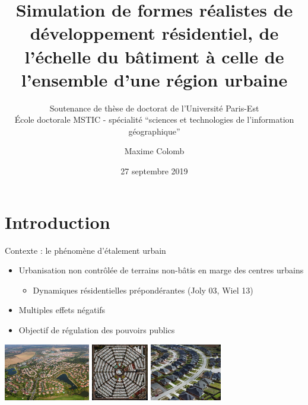 \documentclass[xcolor=table]{beamer}
\title{Simulation de formes réalistes de développement résidentiel, de l'échelle du bâtiment à celle de l'ensemble d'une région urbaine}
\author{Maxime Colomb}
\subtitle{
  \tiny
  Soutenance de thèse de doctorat de l'Université Paris-Est\\
  \'Ecole doctorale MSTIC - spécialité ``sciences et technologies de l'information géographique''
}
\date{27 septembre 2019}
\begin{document}
\maketitle
\section{Introduction}
\begin{frame}{Contexte : le phénomène d'étalement urbain}
	\begin{block}{}
		\begin{itemize}
			\item Urbanisation non contrôlée de terrains non-bâtis en marge des centres urbains
			\begin{itemize}
				\item Dynamiques résidentielles prépondérantes (Joly 03, Wiel 13)
			\end{itemize}
			\item Multiples effets négatifs
			\item Objectif de régulation des pouvoirs publics
		\end{itemize}
		\includegraphics[height=2.5cm]{Images/consome.jpg}
		\includegraphics[height=2.5cm]{Images/sto.jpeg}
		\includegraphics[height=2.5cm]{Images/maiz.jpg}
	\end{block}
\end{frame}
\end{document}
